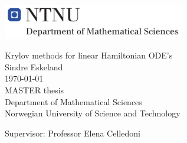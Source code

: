 
\thispagestyle{empty}
\includegraphics[height=0.6in]{fig/rams}
\mbox{}\\[6pc]
\begin{center}
\Huge{Krylov methods for linear Hamiltonian ODE's}\\[2pc]

\Large{Sindre Eskeland}\\[1pc]
\large{\today}\\[2pc]

MASTER thesis\\
Department of Mathematical Sciences\\
Norwegian University of Science and Technology
\end{center}
\vfill

\noindent Supervisor: Professor Elena Celledoni


